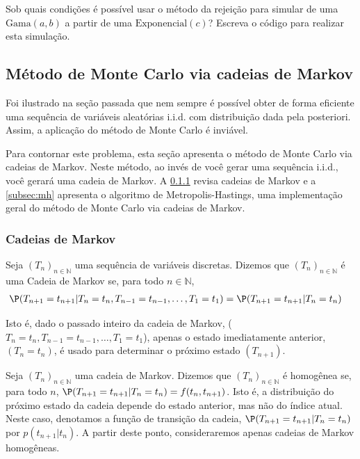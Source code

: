 \begin{exercise}
 Sob quais condições é possível usar
 o método da rejeição para simular de uma
 $\text{Gama}(a,b)$ a partir de uma
 $\text{Exponencial}(c)$? Escreva o
 código para realizar esta simulação. 
\end{exercise}



\subsection{Método de Monte Carlo via cadeias de Markov}

Foi ilustrado na seção passada que
nem sempre é possível obter de forma eficiente
uma sequência de variáveis aleatórias i.i.d.
com distribuição dada pela posteriori. Assim,
a aplicação do método de Monte Carlo é
inviável. 

Para contornar este problema, esta seção
apresenta o método de Monte Carlo via
cadeias de Markov. Neste método, ao invés de
você gerar uma sequência i.i.d., você
gerará uma cadeia de Markov. 
A \cref{subsec:markov} revisa cadeias de Markov e
a \cref{subsec:mh} apresenta o algoritmo de
Metropolis-Hastings, uma implementação geral do
método de Monte Carlo via cadeias de Markov.

\subsubsection{Cadeias de Markov}
\label{subsec:markov}

\begin{definition}
 Seja $(T_{n})_{n \in \mathbb{N}}$ uma
 sequência de variáveis discretas.
 Dizemos que $(T_{n})_{n \in \mathbb{N}}$ é
 uma Cadeia de Markov se,
 para todo $n \in \mathbb{N}$,
 \begin{align*}
  \P(T_{n+1}=t_{n+1}|T_{n}=t_{n}, T_{n-1}=t_{n-1},\ldots, T_{1}=t_{1}) 
  &= \P(T_{n+1}=t_{n+1}|T_{n}=t_{n})
 \end{align*}
\end{definition}
Isto é, dado o passado inteiro da cadeia de Markov, ($T_{n}=t_{n}, T_{n-1}=t_{n-1}, \ldots, T_{1}=t_{1}$),
apenas o estado imediatamente anterior,
$(T_{n}=t_{n})$, é usado para determinar o próximo estado $(T_{n+1})$.
      
\begin{definition}
 Seja $(T_{n})_{n \in \mathbb{N}}$ uma 
 cadeia de Markov.  Dizemos que
 $(T_{n})_{n \in \mathbb{N}}$ é homogênea se,
 para todo $n$, $\P(T_{n+1}=t_{n+1}|T_{n}=t_{n}) = f(t_{n},t_{n+1})$. 
 Isto é, a distribuição do próximo estado da
 cadeia depende do estado anterior, mas não do
 índice atual. Neste caso, denotamos a função de
 transição da cadeia,  $\P(T_{n+1}=t_{n+1}|T_{n}=t_{n})$ por
 $p(t_{n+1}|t_{n})$.
 A partir deste ponto, consideraremos apenas
 cadeias de Markov homogêneas. 
\end{definition}

